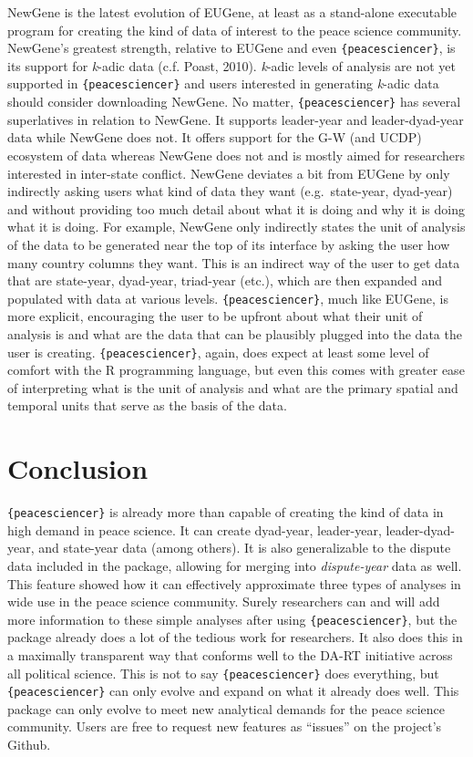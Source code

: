 \documentclass[
  11pt,
]{article}
\begin{document}
NewGene is the latest evolution of EUGene, at least as a stand-alone executable program for creating the kind of data of interest to the peace science community. NewGene's greatest strength, relative to EUGene and even \texttt{\{peacesciencer\}}, is its support for \emph{k}-adic data (c.f. Poast, 2010). \emph{k}-adic levels of analysis are not yet supported in \texttt{\{peacesciencer\}} and users interested in generating \emph{k}-adic data should consider downloading NewGene. No matter, \texttt{\{peacesciencer\}} has several superlatives in relation to NewGene. It supports leader-year and leader-dyad-year data while NewGene does not. It offers support for the G-W (and UCDP) ecosystem of data whereas NewGene does not and is mostly aimed for researchers interested in inter-state conflict. NewGene deviates a bit from EUGene by only indirectly asking users what kind of data they want (e.g.~state-year, dyad-year) and without providing too much detail about what it is doing and why it is doing what it is doing. For example, NewGene only indirectly states the unit of analysis of the data to be generated near the top of its interface by asking the user how many country columns they want. This is an indirect way of the user to get data that are state-year, dyad-year, triad-year (etc.), which are then expanded and populated with data at various levels. \texttt{\{peacesciencer\}}, much like EUGene, is more explicit, encouraging the user to be upfront about what their unit of analysis is and what are the data that can be plausibly plugged into the data the user is creating. \texttt{\{peacesciencer\}}, again, does expect at least some level of comfort with the R programming language, but even this comes with greater ease of interpreting what is the unit of analysis and what are the primary spatial and temporal units that serve as the basis of the data.

\hypertarget{conclusion}{%
\section{Conclusion}\label{conclusion}}

\texttt{\{peacesciencer\}} is already more than capable of creating the kind of data in high demand in peace science. It can create dyad-year, leader-year, leader-dyad-year, and state-year data (among others). It is also generalizable to the dispute data included in the package, allowing for merging into \emph{dispute-year} data as well. This feature showed how it can effectively approximate three types of analyses in wide use in the peace science community. Surely researchers can and will add more information to these simple analyses after using \texttt{\{peacesciencer\}}, but the package already does a lot of the tedious work for researchers. It also does this in a maximally transparent way that conforms well to the DA-RT initiative across all political science. This is not to say \texttt{\{peacesciencer\}} does everything, but \texttt{\{peacesciencer\}} can only evolve and expand on what it already does well. This package can only evolve to meet new analytical demands for the peace science community. Users are free to request new features as ``issues'' on the project's Github.
\end{document}
